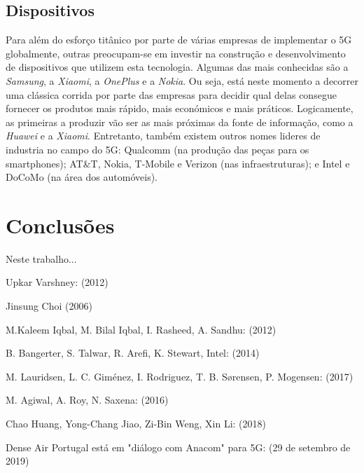 \documentclass{llncs}
\begin{document}
\subsection{Dispositivos}
Para além do esforço titânico por parte de várias empresas de
implementar o 5G globalmente, outras preocupam-se em 
investir na construção e desenvolvimento de dispositivos que utilizem
esta tecnologia. Algumas das mais conhecidas são a \textit{Samsung}, a
\textit{Xiaomi}, a \textit{OnePlus} e a \textit{Nokia}.
Ou seja, está neste momento a decorrer uma clássica corrida por parte
das empresas para decidir qual delas consegue fornecer os produtos
mais rápido, mais económicos e mais práticos.
Logicamente, as primeiras a produzir vão ser as mais próximas da fonte
de informação, como a \textit{Huawei} e a \textit{Xiaomi}.
Entretanto, também existem outros nomes lideres de industria no campo 
do 5G: Qualcomm (na produção das peças para os smartphones);
AT\&T, Nokia, T-Mobile e Verizon (nas infraestruturas); e Intel e 
DoCoMo (na área dos automóveis). 
\section{Conclusões}

Neste trabalho...

%

\begin{thebibliography}{1}

Upkar Varshney:
 (2012)

Jinsung Choi
 (2006)

M.Kaleem Iqbal, M. Bilal Iqbal, I. Rasheed, A. Sandhu:
 (2012)

B. Bangerter, S. Talwar, R. Arefi, K. Stewart, Intel:
 (2014)

M. Lauridsen, L. C. Giménez, I. Rodriguez, T. B. Sørensen, P. Mogensen:
 (2017)

M. Agiwal, A. Roy, N. Saxena:
 (2016)

Chao Huang, Yong-Chang Jiao, Zi-Bin Weng, Xin Li:
 (2018) 

Dense Air Portugal está em "diálogo com Anacom" para 5G:
(29 de setembro de 2019)


\end{thebibliography}
\end{document}
